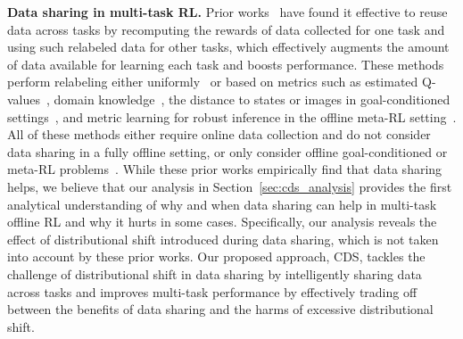 \textbf{Data sharing in multi-task RL.} Prior works~\citep{andrychowicz2017hindsight,kaelbling1993learning,pong2018temporal,schaul2015universal,eysenbach2020rewriting,li2020generalized,kalashnikov2021mt,chebotar2021actionable} have found it effective to reuse data across tasks by recomputing the rewards of data collected for one task and using such relabeled data for other tasks, which effectively augments the amount of data available for learning each task and boosts performance. These methods perform relabeling either uniformly~\citep{kalashnikov2021mt} or based on metrics such as estimated Q-values~\citep{eysenbach2020rewriting,li2020generalized}, domain knowledge~\citep{kalashnikov2021mt}, the distance to states or images in goal-conditioned settings~\citep{andrychowicz2017hindsight,pong2018temporal,nair2018visual,liu2019competitive,sun2019policy,lin2019reinforcement,huang2019mapping,lynch2020grounding,yang2021bias,chebotar2021actionable}, {and metric learning for robust inference in the offline meta-RL setting~\citep{li2019multi}. All of these methods either require online data collection and do not consider data sharing in a fully offline setting, or only consider offline goal-conditioned or meta-RL problems~\citep{chebotar2021actionable,li2019multi}.} {While these prior works empirically find that data sharing helps, we believe that our analysis in Section~\ref{sec:cds_analysis} provides the first analytical understanding of why and when data sharing can help in multi-task offline RL and why it hurts in some cases.} {Specifically, our analysis reveals the effect of distributional shift introduced during data sharing, which is not taken into account by these prior works. Our proposed approach, CDS, tackles the challenge of distributional shift in data sharing by intelligently sharing data across tasks and improves multi-task performance by effectively trading off between the benefits of data sharing and the harms of excessive distributional shift.}
